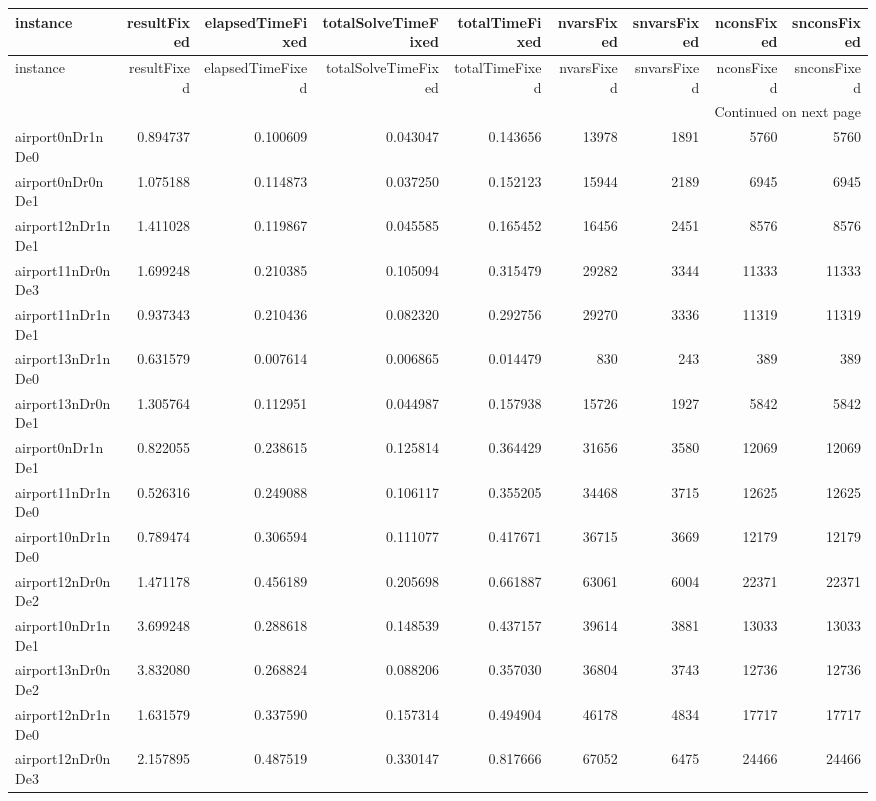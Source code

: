 
\begin{longtable}{|l|r|r|r|r|r|r|r|r|}
\toprule
instance & resultFixed & elapsedTimeFixed & totalSolveTimeFixed & totalTimeFixed & nvarsFixed & snvarsFixed & nconsFixed & snconsFixed \\
\midrule
\endfirsthead
\toprule
instance & resultFixed & elapsedTimeFixed & totalSolveTimeFixed & totalTimeFixed & nvarsFixed & snvarsFixed & nconsFixed & snconsFixed \\
\midrule
\endhead
\midrule
\multicolumn{9}{r}{Continued on next page} \\
\midrule
\endfoot
\bottomrule
\endlastfoot
airport0nDr1nDe0 & 0.894737 & 0.100609 & 0.043047 & 0.143656 & 13978 & 1891 & 5760 & 5760 \\
airport0nDr0nDe1 & 1.075188 & 0.114873 & 0.037250 & 0.152123 & 15944 & 2189 & 6945 & 6945 \\
airport12nDr1nDe1 & 1.411028 & 0.119867 & 0.045585 & 0.165452 & 16456 & 2451 & 8576 & 8576 \\
airport11nDr0nDe3 & 1.699248 & 0.210385 & 0.105094 & 0.315479 & 29282 & 3344 & 11333 & 11333 \\
airport11nDr1nDe1 & 0.937343 & 0.210436 & 0.082320 & 0.292756 & 29270 & 3336 & 11319 & 11319 \\
airport13nDr1nDe0 & 0.631579 & 0.007614 & 0.006865 & 0.014479 & 830 & 243 & 389 & 389 \\
airport13nDr0nDe1 & 1.305764 & 0.112951 & 0.044987 & 0.157938 & 15726 & 1927 & 5842 & 5842 \\
airport0nDr1nDe1 & 0.822055 & 0.238615 & 0.125814 & 0.364429 & 31656 & 3580 & 12069 & 12069 \\
airport11nDr1nDe0 & 0.526316 & 0.249088 & 0.106117 & 0.355205 & 34468 & 3715 & 12625 & 12625 \\
airport10nDr1nDe0 & 0.789474 & 0.306594 & 0.111077 & 0.417671 & 36715 & 3669 & 12179 & 12179 \\
airport12nDr0nDe2 & 1.471178 & 0.456189 & 0.205698 & 0.661887 & 63061 & 6004 & 22371 & 22371 \\
airport10nDr1nDe1 & 3.699248 & 0.288618 & 0.148539 & 0.437157 & 39614 & 3881 & 13033 & 13033 \\
airport13nDr0nDe2 & 3.832080 & 0.268824 & 0.088206 & 0.357030 & 36804 & 3743 & 12736 & 12736 \\
airport12nDr1nDe0 & 1.631579 & 0.337590 & 0.157314 & 0.494904 & 46178 & 4834 & 17717 & 17717 \\
airport12nDr0nDe3 & 2.157895 & 0.487519 & 0.330147 & 0.817666 & 67052 & 6475 & 24466 & 24466 \\

\end{longtable}
